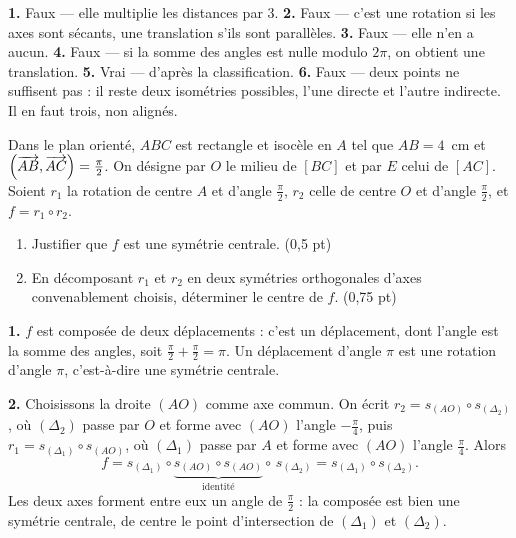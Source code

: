 \begin{corrige}[je me teste]
\textbf{1.} Faux — elle multiplie les distances par $3$.
\textbf{2.} Faux — c'est une rotation si les axes sont sécants, une
translation s'ils sont parallèles.
\textbf{3.} Faux — elle n'en a aucun.
\textbf{4.} Faux — si la somme des angles est nulle modulo $2\pi$, on obtient
une translation.
\textbf{5.} Vrai — d'après la classification.
\textbf{6.} Faux — deux points ne suffisent pas : il reste deux isométries
possibles, l'une directe et l'autre indirecte. Il en faut trois, non alignés.
\end{corrige}

\begin{commeaubac}
Dans le plan orienté, $ABC$ est rectangle et isocèle en $A$ tel que
$AB = 4$~cm et $\left(\overrightarrow{AB},\overrightarrow{AC}\right) = \frac{\pi}{2}$. On désigne
par $O$ le milieu de $[BC]$ et par $E$ celui de $[AC]$. Soient $r_{1}$ la
rotation de centre $A$ et d'angle $\frac{\pi}{2}$, $r_{2}$ celle de centre $O$
et d'angle $\frac{\pi}{2}$, et $f = r_{1} \circ r_{2}$.

\begin{enumerate}[label=\textbf{\arabic*.}, leftmargin=*, itemsep=0.25em]
  \item Justifier que $f$ est une symétrie centrale. \hfill\textup{(0,5 pt)}
  \item En décomposant $r_{1}$ et $r_{2}$ en deux symétries orthogonales
        d'axes convenablement choisis, déterminer le centre de $f$.
        \hfill\textup{(0,75 pt)}
\end{enumerate}
\end{commeaubac}

\begin{corrige}
\textbf{1.} $f$ est composée de deux déplacements : c'est un déplacement, dont
l'angle est la somme des angles, soit $\frac{\pi}{2}+\frac{\pi}{2} = \pi$.
Un déplacement d'angle $\pi$ est une rotation d'angle $\pi$, c'est-à-dire une
symétrie centrale.

\textbf{2.} Choisissons la droite $(AO)$ comme axe commun. On écrit
$r_{2} = s_{(AO)} \circ s_{(\Delta_{2})}$, où $(\Delta_{2})$ passe par $O$ et
forme avec $(AO)$ l'angle $-\frac{\pi}{4}$, puis
$r_{1} = s_{(\Delta_{1})} \circ s_{(AO)}$, où $(\Delta_{1})$ passe par $A$ et
forme avec $(AO)$ l'angle $\frac{\pi}{4}$. Alors
\[
  f = s_{(\Delta_{1})} \circ \underbrace{s_{(AO)} \circ s_{(AO)}}_{
  \text{identité}} \circ\, s_{(\Delta_{2})}
  = s_{(\Delta_{1})} \circ s_{(\Delta_{2})} .
\]
Les deux axes forment entre eux un angle de $\frac{\pi}{2}$ : la composée est
bien une symétrie centrale, de centre le point d'intersection de
$(\Delta_{1})$ et $(\Delta_{2})$.
\end{corrige}

